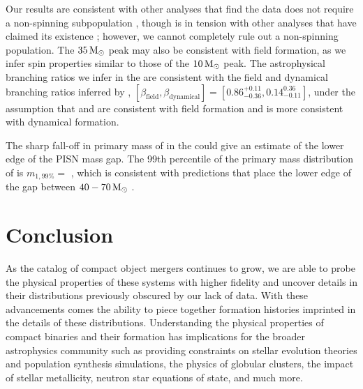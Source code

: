 Our results are consistent with other analyses that find the data does not require a non-spinning subpopulation \citep{arXiv2205.08574,2301.01312}, though is in tension with other analyses that have claimed its existence \citep{doi.org/10.3847/2041-8213/ac2f3c,2105.10580}; however, we cannot completely rule out a non-spinning population. The $35{\,\rm M}_\odot$ peak may also be consistent with field formation, as we infer spin properties similar to those of the $10{\,\rm M}_\odot$ peak. The astrophysical branching ratios we infer in the \comp{} are consistent with the field and dynamical branching ratios inferred by \citet{2011.10057}, $[\beta_{\text{field}}, \beta_{\text{dynamical}}] = [0.86^{+0.11}_{-0.36}, 0.14^{0.36}_{-0.11}]$, under the assumption that \first{} and \contA{} are consistent with field formation and \contB{} is more consistent with dynamical formation.

The sharp fall-off in primary mass of \contA{} in the \comp{} could give an estimate of the lower edge of the PISN mass gap. The 99th percentile of the primary mass distribution of \contA{} is $m_{1,99\%} = $ \result{$\CIPlusMinus{\macros[Mass][Composite][ContinuumA][99percentile]}$ \msun}, which is consistent with predictions that place the lower edge of the gap between $40-70{\,\rm M}_\odot$ \citep{1901.00215,1910.12874v1,2103.07933v1,2104.07783v2}.

\section{Conclusion} \label{sec:conclusion}


As the catalog of compact object mergers continues to grow, we are able to probe the physical properties of these systems with higher fidelity and uncover details in their distributions previously obscured by our lack of data. With these advancements comes the ability to piece together formation histories imprinted in the details of these distributions. Understanding the physical properties of compact binaries and their formation has implications for the broader astrophysics community such as providing constraints on stellar evolution theories and population synthesis simulations, the physics of globular clusters, the impact of stellar metallicity, neutron star equations of state, and much more.

